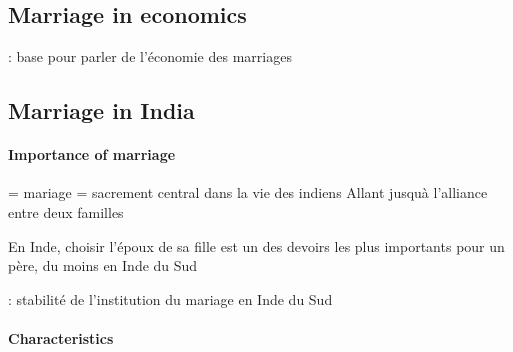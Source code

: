 \documentclass[a4paper, 11pt, onecolumn]{article}
\begin{document}
\subsection{Marriage in economics}
\cite{Becker1973} : base pour parler de l'économie des marriages



\subsection{Marriage in India}

\paragraph{Importance of marriage}
\cite{Radhakrishnan1937} = mariage = sacrement central dans la vie des indiens
Allant jusquà l'alliance entre deux familles \citep{Sheela2003}

En Inde, choisir l’époux de sa fille est un des devoirs les plus importants pour un père, du
moins en Inde du Sud \cite{Jejeebhoy2005}

\cite{James2015} : stabilité de l'institution du mariage en Inde du Sud



\paragraph{Characteristics}
\end{document}
